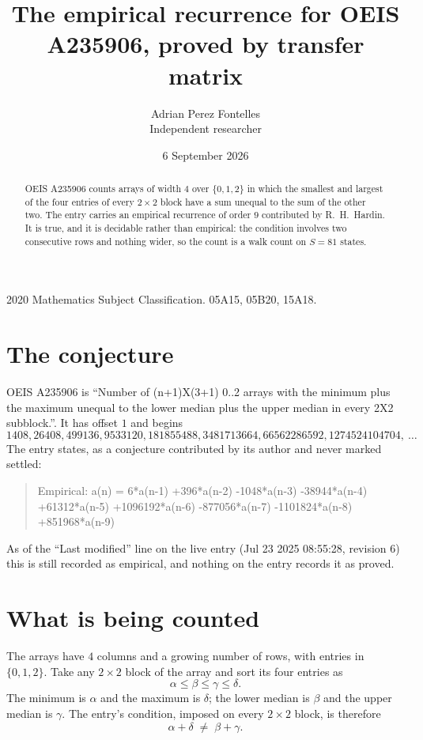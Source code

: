 \documentclass[11pt,a4paper]{article}
\title{The empirical recurrence for OEIS A235906, proved by transfer matrix}
\author{Adrian Perez Fontelles\\ \small Independent researcher}
\date{6 September 2026}
\theoremstyle{plain}
\theoremstyle{definition}
\begin{document}
\maketitle

\begin{abstract}
OEIS A235906 counts arrays of width $4$ over $\{0,1,2\}$ in which the smallest and largest of the
four entries of every $2\times2$ block have a sum unequal to the sum of the other two. The entry
carries an empirical recurrence of order $9$ contributed by R.~H.~Hardin. It is true, and
it is decidable rather than empirical: the condition involves two consecutive rows and nothing
wider, so the count is a walk count on $S=81$ states.
\end{abstract}

\noindent\small 2020 Mathematics Subject Classification. 05A15, 05B20, 15A18.\normalsize

\section{The conjecture}

OEIS A235906 is ``Number of (n+1)X(3+1) 0..2 arrays with the minimum plus the maximum unequal to the lower median plus the upper median in every 2X2 subblock.''. It has offset $1$ and begins
\[
1408, 26408, 499136, 9533120, 181855488, 3481713664, 66562286592, 1274524104704,\ \dots
\]
The entry states, as a conjecture contributed by its author and never marked settled:
\begin{quote}
Empirical: a(n) = 6*a(n-1) +396*a(n-2) -1048*a(n-3) -38944*a(n-4) +61312*a(n-5) +1096192*a(n-6) -877056*a(n-7) -1101824*a(n-8) +851968*a(n-9)
\end{quote}
As of the ``Last modified'' line on the live entry (Jul 23 2025 08:55:28, revision 6) this is still
recorded as empirical, and nothing on the entry records it as proved.

\section{What is being counted}

The arrays have $4$ columns and a growing number of rows, with entries in $\{0,1,2\}$. Take any
$2\times2$ block of the array and sort its four entries as
\[
\alpha\le\beta\le\gamma\le\delta .
\]
The minimum is $\alpha$ and the maximum is $\delta$; the lower median is $\beta$ and the upper
median is $\gamma$. The entry's condition, imposed on every $2\times2$ block, is therefore
\[
\alpha+\delta\;\neq\;\beta+\gamma .
\]
\end{document}
